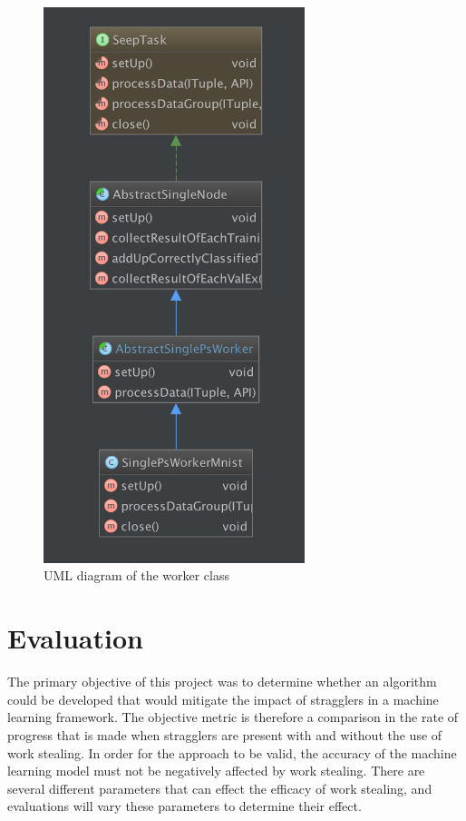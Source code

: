 \documentclass[12pt]{article}
\begin{document}
\begin{figure}[H]
  \centering
  \includegraphics[width=3in]{workeruml}
  \caption[]{UML diagram of the worker class}
  \label{WorkerUML}
\end{figure}

\newpage

\section{Evaluation}

The primary objective of this project was to determine whether an algorithm could be developed that would mitigate the impact of stragglers in a machine learning framework. The objective metric is therefore a comparison in the rate of progress that is made when stragglers are present with and without the use of work stealing. In order for the approach to be valid, the accuracy of the machine learning model must not be negatively affected by work stealing.
\newline
\newline
There are several different parameters that can effect the efficacy of work stealing, and evaluations will vary these parameters to determine their effect.
\end{document}
